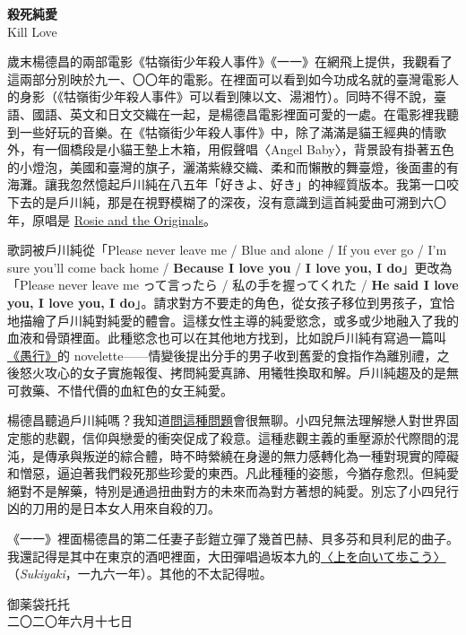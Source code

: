 \documentclass[10pt]{article}
\begin{document}
\begin{flushleft}
\textbf{殺死純愛}\\
Kill Love\\
\end{flushleft}
\vspace{3em}

歲末楊德昌的兩部電影《牯嶺街少年殺人事件》《一一》在網飛上提供，我觀看了這兩部分別映於九一、〇〇年的電影。在裡面可以看到如今功成名就的臺灣電影人的身影（《牯嶺街少年殺人事件》可以看到陳以文、湯湘竹）。同時不得不說，臺語、國語、英文和日文交織在一起，是楊德昌電影裡面可愛的一處。在電影裡我聽到一些好玩的音樂。在《牯嶺街少年殺人事件》中，除了滿滿是貓王經典的情歌外，有一個橋段是小貓王墊上木箱，用假聲唱〈Angel
Baby〉，背景設有掛著五色的小燈泡，美國和臺灣的旗子，灑滿紫綠交織、柔和而懶散的舞臺燈，後面畫的有海灘。讓我忽然憶起戶川純在八五年「好きよ、好き」的神經質版本。我第一口咬下去的是戶川純，那是在視野模糊了的深夜，沒有意識到這首純愛曲可溯到六〇年，原唱是
\href{https://www.youtube.com/watch?v=zQRYk7stYIw}{Rosie and the
Originals}。

歌詞被戶川純從「Please never leave me / Blue and alone / If you ever go
/ I'm sure you'll come back home / \textbf{Because I love you} /
\textbf{I love you, I do}」更改為「Please never leave me って言ったら /
私の手を握ってくれた / \textbf{He said I love you, I love you, I
do}」。請求對方不要走的角色，從女孩子移位到男孩子，宜恰地描繪了戶川純對純愛的體會。這樣女性主導的純愛慾念，或多或少地融入了我的血液和骨頭裡面。此種慾念也可以在其他地方找到，比如說戶川純有寫過一篇叫\href{https://juntogawa.org/something-extra}{《愚行》}的
novelette{——}情變後提出分手的男子收到舊愛的食指作為離別禮，之後怒火攻心的女子實施報復、拷問純愛真諦、用犧牲換取和解。戶川純趨及的是無可救藥、不惜代價的血紅色的女王純愛。

楊德昌聽過戶川純嗎？我知道\href{https://www.zhihu.com/question/364129176}{問這種問題}會很無聊。小四兒無法理解戀人對世界固定態的悲觀，信仰與戀愛的衝突促成了殺意。這種悲觀主義的重壓源於代際間的混沌，是傳承與叛逆的綜合體，時不時縈繞在身邊的無力感轉化為一種對現實的障礙和憎惡，逼迫著我們殺死那些珍愛的東西。凡此種種的姿態，今猶存愈烈。但純愛絕對不是解藥，特別是通過扭曲對方的未來而為對方著想的純愛。別忘了小四兒行凶的刀用的是日本女人用來自殺的刀。

《一一》裡面楊德昌的第二任妻子彭鎧立彈了幾首巴赫、貝多芬和貝利尼的曲子。我還記得是其中在東京的酒吧裡面，大田彈唱過{坂}本九的\href{https://de.wikipedia.org/wiki/Sukiyaki_(Lied)}{〈上を向いて{歩}こう〉}（\emph{Sukiyaki}，一九六一年）。其他的不太記得啦。

\vspace{3em}
\begin{flushleft}
\small{御薬袋托托\\
二〇二〇年六月十七日}
\end{flushleft}
\end{document}
